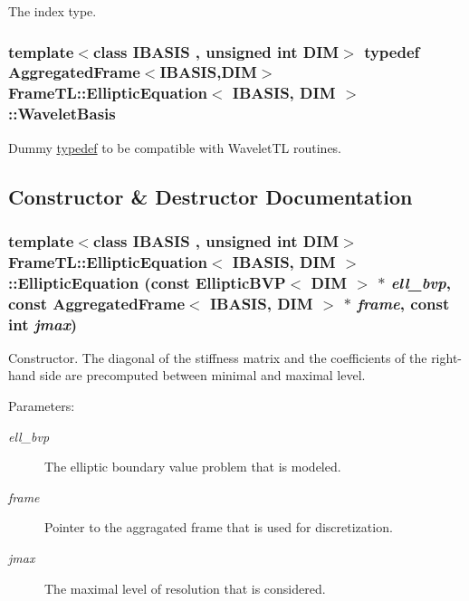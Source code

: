 The index type. \hypertarget{classFrameTL_1_1EllipticEquation_44b9abebf9c101271d3ddec1ce3ffd3a}{
\subsubsection[{WaveletBasis}]{\setlength{\rightskip}{0pt plus 5cm}template$<$class IBASIS , unsigned int DIM$>$ {\bf typedef} {\bf AggregatedFrame}$<$IBASIS,DIM$>$ {\bf FrameTL::EllipticEquation}$<$ IBASIS, DIM $>$::{\bf WaveletBasis}}}
\label{classFrameTL_1_1EllipticEquation_44b9abebf9c101271d3ddec1ce3ffd3a}


Dummy \hyperlink{structtypedef}{typedef} to be compatible with WaveletTL routines. 

\subsection{Constructor \& Destructor Documentation}
\hypertarget{classFrameTL_1_1EllipticEquation_44b302a82e544d16d49cf6b4dab933b0}{
\subsubsection[{EllipticEquation}]{\setlength{\rightskip}{0pt plus 5cm}template$<$class IBASIS , unsigned int DIM$>$ {\bf FrameTL::EllipticEquation}$<$ IBASIS, DIM $>$::{\bf EllipticEquation} (const EllipticBVP$<$ DIM $>$ $\ast$ {\em ell\_\-bvp}, \/  const {\bf AggregatedFrame}$<$ IBASIS, DIM $>$ $\ast$ {\em frame}, \/  const int {\em jmax})}}
\label{classFrameTL_1_1EllipticEquation_44b302a82e544d16d49cf6b4dab933b0}


Constructor. The diagonal of the stiffness matrix and the coefficients of the right-hand side are precomputed between minimal and maximal level.

\begin{Desc}
\item[Parameters:]
\begin{description}
\item[{\em ell\_\-bvp}]The elliptic boundary value problem that is modeled. \item[{\em frame}]Pointer to the aggragated frame that is used for discretization. \item[{\em jmax}]The maximal level of resolution that is considered. \end{description}
\end{Desc}


